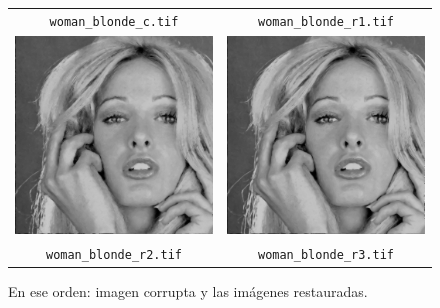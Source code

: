 \begin{figure}[H]
\begin{tabular}{cc}
		\tiny\texttt{woman\_blonde\_c.tif}&\tiny\texttt{woman\_blonde\_r1.tif}\vspace{0.2cm}\\
		\includegraphics[scale=0.2]{Graphics/Examples/woman_blonde_iteration_2.tif}&
		\includegraphics[scale=0.2]{Graphics/Examples/woman_blonde_iteration_3.tif}\\
		\tiny\texttt{woman\_blonde\_r2.tif}&\tiny\texttt{woman\_blonde\_r3.tif}\\
	\end{tabular}
	\caption{En ese orden: imagen corrupta y las im\'agenes restauradas.}
	\label{fig:inpainting_woman_blonde}
\end{figure}
